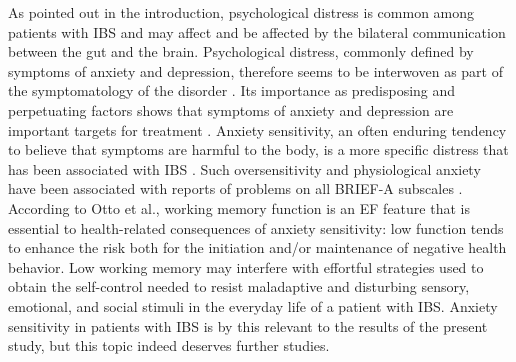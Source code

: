 \documentclass[jcm,article,submit,pdftex,moreauthors]{Definitions/mdpi}
\begin{document}
 As pointed out in the introduction, psychological distress is common among patients with IBS and may affect and be affected by the bilateral communication between the gut and the brain. Psychological distress, commonly defined by symptoms of anxiety and depression, therefore seems to be interwoven as part of the symptomatology of the disorder \cite{midenfjord2019anxiety}. Its importance as predisposing and perpetuating factors shows that symptoms of anxiety and depression are important targets for treatment \cite{kutschke2022relationships}. Anxiety sensitivity, an often enduring tendency to believe that symptoms are harmful to the body, is a more specific distress that has been associated with IBS \cite{sugaya2013irritable}. Such oversensitivity and physiological anxiety have been associated with reports of problems on all BRIEF-A subscales \cite{meltzer2017association}.  According to Otto et al., \cite{otto2016anxiety} working memory function is an EF feature that is essential to health-related consequences of anxiety sensitivity: low function tends to enhance the risk both for the initiation and/or maintenance of negative health behavior. Low working memory may interfere with effortful strategies used to obtain the self-control needed to resist maladaptive and disturbing sensory, emotional, and social stimuli in the everyday life of a patient with IBS. Anxiety sensitivity in patients with IBS is by this relevant to the results of the present study, but this topic indeed deserves further studies.
 
\end{document}

